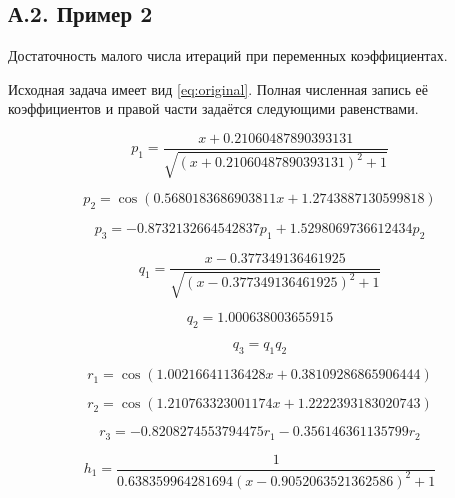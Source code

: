\clearpage

\subsection*{А.2. Пример 2}\label{app:ex2}

Достаточность малого числа итераций при переменных коэффициентах.

Исходная задача имеет вид \eqref{eq:original}. Полная численная запись её коэффициентов и правой части задаётся следующими равенствами.

\begin{equation}
p_{1}=\frac{x + 0.21060487890393131}{\sqrt{\left(x + 0.21060487890393131\right)^{2} + 1}}
\end{equation}


\begin{equation}
p_{2}=\cos{\left(0.5680183686903811 x + 1.2743887130599818 \right)}
\end{equation}


\begin{equation}
p_{3}=- 0.8732132664542837 p_{1} + 1.5298069736612434 p_{2}
\end{equation}


\begin{equation}
q_{1}=\frac{x - 0.377349136461925}{\sqrt{\left(x - 0.377349136461925\right)^{2} + 1}}
\end{equation}


\begin{equation}
q_{2}=1.000638003655915
\end{equation}


\begin{equation}
q_{3}=q_{1} q_{2}
\end{equation}


\begin{equation}
r_{1}=\cos{\left(1.00216641136428 x + 0.38109286865906444 \right)}
\end{equation}


\begin{equation}
r_{2}=\cos{\left(1.210763323001174 x + 1.2222393183020743 \right)}
\end{equation}


\begin{equation}
r_{3}=- 0.8208274553794475 r_{1} - 0.356146361135799 r_{2}
\end{equation}


\begin{equation}
h_{1}=\frac{1}{0.638359964281694 \left(x - 0.9052063521362586\right)^{2} + 1}
\end{equation}


